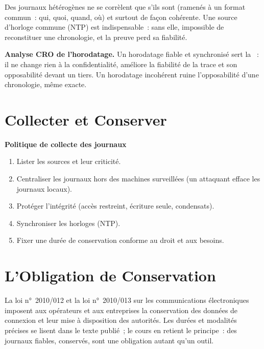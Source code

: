Des journaux hétérogènes ne se corrèlent que s'ils sont 
(ramenés à un format commun~: qui, quoi, quand, où) et surtout
 de façon cohérente. Une source d'horloge commune (NTP)
est indispensable~: sans elle, impossible de reconstituer une chronologie,
et la preuve perd sa fiabilité.

\begin{boxCRO}
\textbf{Analyse CRO de l'horodatage.} Un horodatage fiable et synchronisé
sert la ~: il ne change rien à la confidentialité, améliore la
fiabilité de la trace et son opposabilité devant un tiers. Un horodatage
incohérent ruine l'opposabilité d'une chronologie, même exacte.
\end{boxCRO}

\section{Collecter et Conserver}
\label{sec:c04-conserver}

\begin{boxprocedure}
\textbf{Politique de collecte des journaux}
\begin{enumerate}
    \item Lister les sources et leur criticité.
    \item Centraliser les journaux hors des machines surveillées (un
          attaquant efface les journaux locaux).
    \item Protéger l'intégrité (accès restreint, écriture seule, condensats).
    \item Synchroniser les horloges (NTP).
    \item Fixer une durée de conservation conforme au droit et aux besoins.
\end{enumerate}
\end{boxprocedure}

\section{L'Obligation de Conservation}
\label{sec:c04-obligation}

\begin{boxjuris}
La loi n°~2010/012 et la loi n°~2010/013 sur les communications électroniques
imposent aux opérateurs et aux entreprises la conservation des données de
connexion et leur mise à disposition des autorités. Les durées et modalités
précises se lisent dans le texte publié~; le cours en retient le principe~:
des journaux fiables, conservés, sont une obligation autant qu'un outil.
\end{boxjuris}

